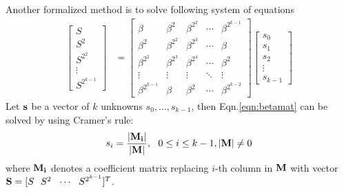 Another formalized method is to solve following system of equations
\begin{align}
\label{eqn:betamat}
\begin{bmatrix}
S \\
S^2 \\
S^{2^2} \\
\vdots \\
S^{2^{k-1}}
\end{bmatrix}
&=
\begin{bmatrix}
\beta & \beta^{2} & \beta^{2^2} & \cdots & \beta^{2^{k-1}}\\
\beta^{2} & \beta^{2^2} & \beta^{2^3} & \cdots & \beta \\
\beta^{2^2} & \beta^{2^3} & \beta^{2^4} & \cdots & \beta^2\\
\vdots & \vdots & \vdots & \ddots & \vdots \\
\beta^{2^{k-1}} & \beta & \beta^2 & \cdots & \beta^{2^{k-2}}
\end{bmatrix}
\begin{bmatrix}
s_0\\
s_1\\
s_2\\
\vdots\\
s_{k-1}
\end{bmatrix}
\end{align}
Let ${\bf s}$ be a vector of $k$ unknowns $s_0,\dots,s_{k-1}$,
then Eqn.\ref{eqn:betamat} can be solved by using Cramer's rule:
\begin{equation}
\label{eqn:Cramer}
s_i = \frac{\Mi}{\M}, \ \ 0\leq i\leq k-1, \M \neq 0
\end{equation}
where ${\bf M_i}$ denotes a coefficient matrix replacing $i$-th column in ${\bf M}$ with
vector ${\bf S} = [S~~S^2~~\cdots~~S^{2^{k-1}}]^T$.

